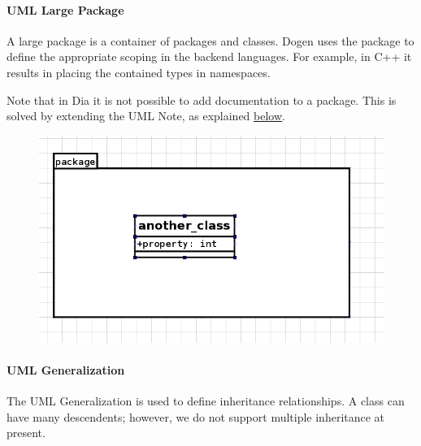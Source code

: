 \documentclass{book}
\begin{document}
\paragraph{UML Large Package}

A large package is a container of packages and classes. Dogen uses the
package to define the appropriate scoping in the backend
languages. For example, in C++ it results in placing the contained
types in namespaces.

Note that in Dia it is not possible to add documentation to a
package. This is solved by extending the UML Note, as explained
\href{https://github.com/DomainDrivenConsulting/dogen/blob/master/doc/manual/manual.org#uml-note}{below}.

\begin{figure}[H]
    \centering
    \includegraphics[scale=0.4]{images/class_in_package.png}
    \caption{}
\end{figure}

\paragraph{UML Generalization}

The UML Generalization is used to define inheritance relationships. A
class can have many descendents; however, we do not support multiple
inheritance at present.
\end{document}
